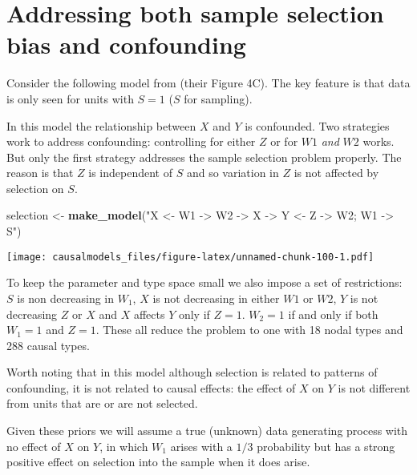 \documentclass[
  12pt,
]{book}
\newenvironment{Shaded}{\begin{snugshade}}{\end{snugshade}}
\newcommand{\FunctionTok}[1]{\textcolor[rgb]{0.13,0.29,0.53}{\textbf{#1}}}
\newcommand{\NormalTok}[1]{#1}
\newcommand{\OtherTok}[1]{\textcolor[rgb]{0.56,0.35,0.01}{#1}}
\newcommand{\StringTok}[1]{\textcolor[rgb]{0.31,0.60,0.02}{#1}}
\begin{document}
\hypertarget{addressing-both-sample-selection-bias-and-confounding}{%
\section{Addressing both sample selection bias and confounding}\label{addressing-both-sample-selection-bias-and-confounding}}

Consider the following model from \citet{bareinboim2016causal} (their Figure 4C). The key feature is that data is only seen for units with \(S=1\) (\(S\) for sampling).

In this model the relationship between \(X\) and \(Y\) is confounded. Two strategies work to address confounding: controlling for either \(Z\) or for \(W1\) \emph{and} \(W2\) works. But only the first strategy addresses the sample selection problem properly. The reason is that \(Z\) is independent of \(S\) and so variation in \(Z\) is not affected by selection on \(S\).

\begin{Shaded}
\begin{Highlighting}[]
\NormalTok{selection }\OtherTok{\textless{}{-}} \FunctionTok{make\_model}\NormalTok{(}\StringTok{"X \textless{}{-} W1 {-}\textgreater{} W2 {-}\textgreater{} X {-}\textgreater{} Y \textless{}{-} Z {-}\textgreater{} W2; W1 {-}\textgreater{} S"}\NormalTok{)}
\end{Highlighting}
\end{Shaded}

\texttt{[image: causalmodels\_files/figure-latex/unnamed-chunk-100-1.pdf]}

To keep the parameter and type space small we also impose a set of restrictions: \(S\) is non decreasing in \(W_1\), \(X\) is not decreasing in either \(W1\) or \(W2\), \(Y\) is not decreasing \(Z\) or \(X\) and \(X\) affects \(Y\) only if \(Z=1\). \(W_2=1\) if and only if both \(W_1=1\) and \(Z=1\). These all reduce the problem to one with 18 nodal types and 288 causal types.

Worth noting that in this model although selection is related to patterns of confounding, it is not related to causal effects: the effect of \(X\) on \(Y\) is not different from units that are or are not selected.

Given these priors we will assume a true (unknown) data generating process with no effect of \(X\) on \(Y\), in which \(W_1\) arises with a \(1/3\) probability but has a strong positive effect on selection into the sample when it does arise.
\end{document}
